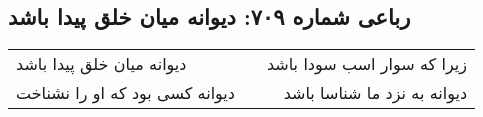 \begin{center}
\section*{رباعی شماره ۷۰۹: دیوانه میان خلق پیدا باشد}
\label{sec:0709}
\begin{longtable}{l p{0.5cm} r}
دیوانه میان خلق پیدا باشد
&&
زیرا که سوار اسب سودا باشد
\\
دیوانه کسی بود که او را نشناخت
&&
دیوانه به نزد ما شناسا باشد
\\
\end{longtable}
\end{center}
